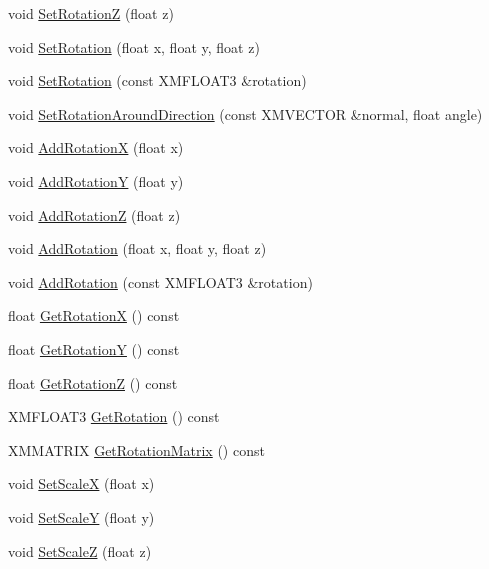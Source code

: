 \begin{DoxyCompactItemize}
void \hyperlink{structmage_1_1_transform_ac587047697f24d2279e7b4f5ab333f44}{Set\+RotationZ} (float z)
\item 
void \hyperlink{structmage_1_1_transform_a8e8fffa4ae9bc969196151daf4502421}{Set\+Rotation} (float x, float y, float z)
\item 
void \hyperlink{structmage_1_1_transform_a6b15a1591a10fe2984b7e8b0b8c92bd5}{Set\+Rotation} (const X\+M\+F\+L\+O\+A\+T3 \&rotation)
\item 
void \hyperlink{structmage_1_1_transform_afad1810a6efc642aeb3c54488501c704}{Set\+Rotation\+Around\+Direction} (const X\+M\+V\+E\+C\+T\+OR \&normal, float angle)
\item 
void \hyperlink{structmage_1_1_transform_ae2a3a4a33ec637b9c39e97519bab5a11}{Add\+RotationX} (float x)
\item 
void \hyperlink{structmage_1_1_transform_afc958d2361a5606962b51646825287e2}{Add\+RotationY} (float y)
\item 
void \hyperlink{structmage_1_1_transform_ae70e192a7d98366b629c3d75a7d2d3bd}{Add\+RotationZ} (float z)
\item 
void \hyperlink{structmage_1_1_transform_a71126843acf10e00d0381b5463978aba}{Add\+Rotation} (float x, float y, float z)
\item 
void \hyperlink{structmage_1_1_transform_a10825624e694790a60e0ea507207132e}{Add\+Rotation} (const X\+M\+F\+L\+O\+A\+T3 \&rotation)
\item 
float \hyperlink{structmage_1_1_transform_aaaf300a4a24b976c271ba17c8a41beaf}{Get\+RotationX} () const
\item 
float \hyperlink{structmage_1_1_transform_a93ccd53bd0a4e71ab7f42447d482ab86}{Get\+RotationY} () const
\item 
float \hyperlink{structmage_1_1_transform_ae1dd099e12e6dedadbc31d679343b39a}{Get\+RotationZ} () const
\item 
X\+M\+F\+L\+O\+A\+T3 \hyperlink{structmage_1_1_transform_a30a0464b1bd2fb37d6b5cc2155323a14}{Get\+Rotation} () const
\item 
X\+M\+M\+A\+T\+R\+IX \hyperlink{structmage_1_1_transform_a27ca7a5c40ea16c9a885a410b2a1f416}{Get\+Rotation\+Matrix} () const
\item 
void \hyperlink{structmage_1_1_transform_a4d1fbb0b609e40b6b13e0e282259d223}{Set\+ScaleX} (float x)
\item 
void \hyperlink{structmage_1_1_transform_a77251bb29fbd26817c0b8c8aabb96ce4}{Set\+ScaleY} (float y)
\item 
void \hyperlink{structmage_1_1_transform_af8cd0167f776708697041544886ff2de}{Set\+ScaleZ} (float z)

\end{DoxyCompactItemize}
